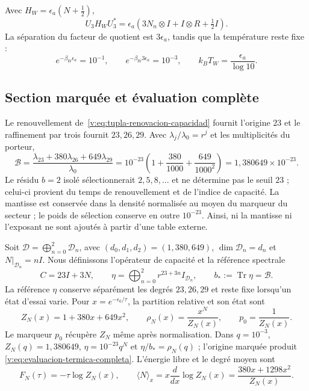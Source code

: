 Avec $H_W=\epsilon_a(N+\tfrac12)$,
\begin{equation}
 U_3H_WU_3^*
 =\epsilon_a\left(3N_n\otimes I+I\otimes R+\tfrac12I\right).
 \label{v:eq:hamiltoniano-agrupado-decimal}
\end{equation}
La séparation du facteur de quotient est $3\epsilon_a$, tandis que la
température reste fixe :
\[
 e^{-\beta_W\epsilon_a}=10^{-1},\qquad
 e^{-\beta_W3\epsilon_a}=10^{-3},\qquad
 k_BT_W=\frac{\epsilon_a}{\log10}.
\]

\subsection{Section marquée et évaluation complète}

Le renouvellement de~\eqref{v:eq:tupla-renovacion-capacidad} fournit
l’origine $23$ et le raffinement par trois fournit $23,26,29$. Avec
$\lambda_j/\lambda_0=r^j$ et les multiplicités du porteur,
\begin{equation}
 \boxed{
 \mathcal B
 =\frac{\lambda_{23}+380\lambda_{26}+649\lambda_{29}}{\lambda_0}
 =10^{-23}\left(1+\frac{380}{1000}+
                    \frac{649}{1000^2}\right)
 =1{,}380649\times10^{-23}.}
 \label{v:eq:evaluacion-termica-completa}
\end{equation}
Le résidu $b=2$ isolé sélectionnerait $2,5,8,\ldots$ et ne détermine pas le
seuil $23$ ; celui-ci provient du temps de renouvellement et de l’indice de capacité.
La mantisse est conservée dans la densité normalisée au moyen du marqueur du
secteur ; le poids de sélection conserve en outre $10^{-23}$. Ainsi, ni la
mantisse ni l’exposant ne sont ajoutés à partir d’une table externe.

Soit
$\mathcal D=\bigoplus_{n=0}^2\mathcal D_n$, avec
$(d_0,d_1,d_2)=(1,380,649)$,
$\dim\mathcal D_n=d_n$ et $N|_{\mathcal D_n}=nI$. Nous définissons l’opérateur
de capacité et la référence spectrale
\begin{equation}
 C=23I+3N,\qquad
 \eta=\bigoplus_{n=0}^2r^{23+3n}I_{\mathcal D_n},\qquad
 b_*:=\operatorname{Tr}\eta=\mathcal B.
 \label{v:eq:referencia-termica-eta}
\end{equation}
La référence $\eta$ conserve séparément les degrés $23,26,29$ et
reste fixe lorsqu’un état d’essai varie. Pour
$x=e^{-\epsilon_0/\tau}$, la partition relative et son état sont
\begin{equation}
 Z_N(x)=1+380x+649x^2,\qquad
 \rho_N(x)=\frac{x^N}{Z_N(x)},\qquad
 p_0=\frac1{Z_N(x)}.
 \label{v:eq:particion-portador-termico}
\end{equation}
Le marqueur $p_0$ récupère $Z_N$ même après normalisation. Dans
$q=10^{-3}$, $Z_N(q)=1{,}380649$,
$\eta=10^{-23}q^N$ et $\eta/b_*=\rho_N(q)$ ; l’origine marquée produit
\eqref{v:eq:evaluacion-termica-completa}. L’énergie libre et le degré moyen sont
\begin{equation}
 F_N(\tau)=-\tau\log Z_N(x),\qquad
 \langle N\rangle_x=x\frac{d}{dx}\log Z_N(x)
 =\frac{380x+1298x^2}{Z_N(x)}.
 \label{v:eq:energia-libre-grado-medio}
\end{equation}

